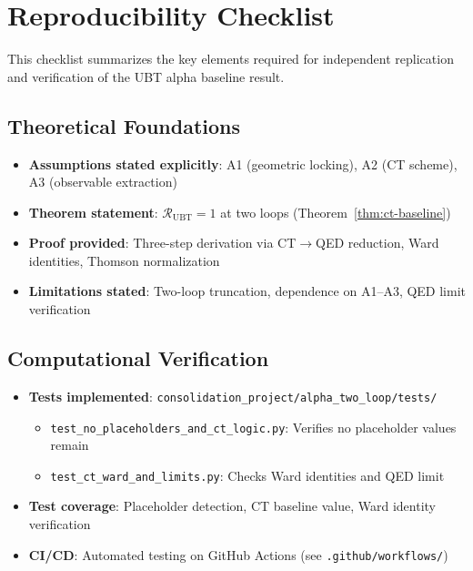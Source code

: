 
\section*{Reproducibility Checklist}

This checklist summarizes the key elements required for independent replication and verification of the UBT alpha baseline result.

\subsection*{Theoretical Foundations}

\begin{itemize}
\item[\checkmark] \textbf{Assumptions stated explicitly}: A1 (geometric locking), A2 (CT scheme), A3 (observable extraction)
\item[\checkmark] \textbf{Theorem statement}: $\mathcal{R}_{\mathrm{UBT}} = 1$ at two loops (Theorem~\ref{thm:ct-baseline})
\item[\checkmark] \textbf{Proof provided}: Three-step derivation via CT$\to$QED reduction, Ward identities, Thomson normalization
\item[\checkmark] \textbf{Limitations stated}: Two-loop truncation, dependence on A1--A3, QED limit verification
\end{itemize}

\subsection*{Computational Verification}

\begin{itemize}
\item[\checkmark] \textbf{Tests implemented}: \texttt{consolidation\_project/alpha\_two\_loop/tests/}
  \begin{itemize}
  \item \texttt{test\_no\_placeholders\_and\_ct\_logic.py}: Verifies no placeholder values remain
  \item \texttt{test\_ct\_ward\_and\_limits.py}: Checks Ward identities and QED limit
  \end{itemize}
\item[\checkmark] \textbf{Test coverage}: Placeholder detection, CT baseline value, Ward identity verification
\item[\checkmark] \textbf{CI/CD}: Automated testing on GitHub Actions (see \texttt{.github/workflows/})
\end{itemize}

